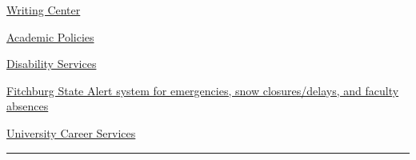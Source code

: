 \documentclass[]{tufte-handout}
\begin{document}
\href{http://www.fitchburgstate.edu/offices-services-directory/tutor-center/writing-help/}{Writing
Center}

\href{http://catalog.fitchburgstate.edu/content.php?catoid=13\&navoid=851}{Academic
Policies}

\href{http://www.fitchburgstate.edu/offices-services-directory/disability-services/}{Disability
Services}

\href{https://www.getrave.com/login/fitchburgstate/}{Fitchburg State
Alert system for emergencies, snow closures/delays, and faculty
absences}

\href{http://www.fitchburgstate.edu/offices-services-directory/career-counseling-and-advising/careerservices/}{University
Career Services}

\begin{center}\rule{0.5\linewidth}{0.5pt}\end{center}
\end{document}
